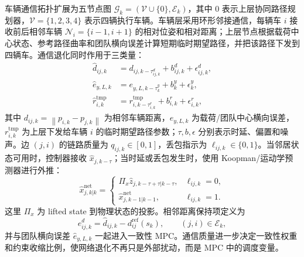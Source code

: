 \documentclass[twocolumn,3p,times,procedia]{elsarticle}
\newif\ifNRReview
\newcommand{\reviewblock}[1]{\ifNRReview\par\smallskip\noindent\begingroup\setlength{\fboxsep}{4pt}\colorbox{yellow!35}{\parbox{0.96\linewidth}{\footnotesize\textbf{当前不足：} #1}}\endgroup\par\smallskip\fi}
\newcommand{\norm}[1]{\left\lVert #1 \right\rVert}
\begin{document}
车辆通信拓扑扩展为五节点图 $\mathcal G_k=(\mathcal V\cup\{0\},\mathcal E_k)$，其中 $0$ 表示上层协同路径规划器，$\mathcal V=\{1,2,3,4\}$ 表示四辆执行车辆。车辆层采用环形邻接通信，每辆车 $i$ 接收前后相邻车辆 $\mathcal N_i=\{i-1,i+1\}$ 的相对位姿和相对距离；上层节点根据载荷中心状态、参考路径曲率和团队横向误差计算短期临时期望路径，并把该路径下发到四辆车。通信退化同时作用于三类量：
\begin{equation}
\begin{aligned}
\hat d_{ij,k}&=d_{ij,k-\tau^d_{ij,k}}+b^d_{ij,k}+\epsilon^d_{ij,k},\\
\hat e_{y,L,k}&=e_{y,L,k-\tau^y_k}+b^y_k+\epsilon^y_k,\\
\hat r_{i,k}^{\mathrm{tmp}}&=r_{i,k-\tau^r_{i,k}}^{\mathrm{tmp}}+b^r_{i,k}+\epsilon^r_{i,k},
\end{aligned}
\label{eq:comm_corrupted_measurements}
\end{equation}
其中 $d_{ij,k}=\norm{p_{i,k}-p_{j,k}}$ 为相邻车辆距离，$e_{y,L,k}$ 为载荷/团队中心横向误差，$r_{i,k}^{\mathrm{tmp}}$ 为上层下发给车辆 $i$ 的临时期望路径参数；$\tau,b,\epsilon$ 分别表示时延、偏置和噪声。边 $(j,i)$ 的链路质量为 $q_{ij,k}\in[0,1]$，丢包指示为 $\ell_{ij,k}\in\{0,1\}$。当邻居状态可用时，控制器接收 $\hat x_{j,k-\tau}$；当时延或丢包发生时，使用 Koopman/运动学预测器进行外推：
\begin{equation}
\hat x_{j,k|k}^{\mathrm{net}}=
\begin{cases}
\Pi_x \hat z_{j,k-\tau+\tau|k-\tau}, & \ell_{ij,k}=0,\\
\hat x_{j,k-1|k-1}^{\mathrm{net}}, & \ell_{ij,k}=1 .
\end{cases}
\label{eq:delay_prediction}
\end{equation}
这里 $\Pi_x$ 为 lifted state 到物理状态的投影。相邻距离保持项定义为
\begin{equation}
e^{d}_{ij,k}=\hat d_{ij,k}-d^{\mathrm{ref}}_{ij}(s_k),\qquad (j,i)\in\mathcal E_k ,
\label{eq:adjacent_distance_error}
\end{equation}
并与团队横向误差 $\hat e_{y,L,k}$ 一起进入一致性 MPC。通信质量进一步决定一致性权重和约束收缩比例，使网络退化不再只是外部扰动，而是 MPC 中的调度变量。
\reviewblock{实验3已启用相邻距离保持诊断、团队横向误差通信退化、上层--下层路径链路以及四轮转向局部路径预瞄；最新 no-offset 面板可把 5 m/s 回头弯写作 RMSE 显著改善且团队中心横向峰值低于 0.2 m，把 15 m/s 正弦写作速度裁剪修正后完整路段闭合，并在 single-seed 下同时降低横向与纵向 RMSE。2/10/15 m/s 和回头弯仍有局部正 gap，因此不能写成全速度全过程逐点严格优于 baseline。}
\end{document}
